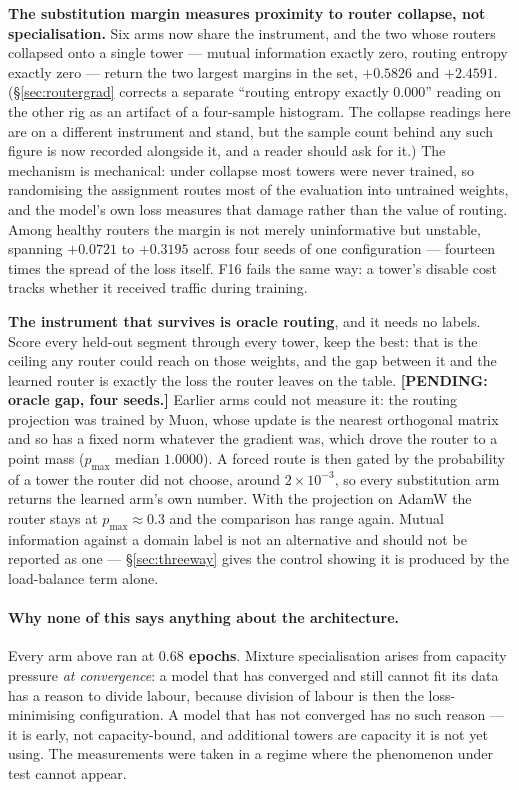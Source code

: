 \documentclass[11pt]{article}
\begin{document}
\textbf{The substitution margin measures proximity to router collapse, not specialisation.} Six arms now share the instrument, and the two whose routers collapsed onto a single tower --- mutual information exactly zero, routing entropy exactly zero --- return the two largest margins in the set, $+0.5826$ and $+2.4591$. (\S\ref{sec:routergrad} corrects a separate ``routing entropy exactly $0.000$'' reading on the other rig as an artifact of a four-sample histogram. The collapse readings here are on a different instrument and stand, but the sample count behind any such figure is now recorded alongside it, and a reader should ask for it.) The mechanism is mechanical: under collapse most towers were never trained, so randomising the assignment routes most of the evaluation into untrained weights, and the model's own loss measures that damage rather than the value of routing. Among healthy routers the margin is not merely uninformative but unstable, spanning $+0.0721$ to $+0.3195$ across four seeds of one configuration --- fourteen times the spread of the loss itself. F16 fails the same way: a tower's disable cost tracks whether it received traffic during training.

\textbf{The instrument that survives is oracle routing}, and it needs no labels. Score every held-out segment through every tower, keep the best: that is the ceiling any router could reach on those weights, and the gap between it and the learned router is exactly the loss the router leaves on the table. \textbf{[PENDING: oracle gap, four seeds.]} Earlier arms could not measure it: the routing projection was trained by Muon, whose update is the nearest orthogonal matrix and so has a fixed norm whatever the gradient was, which drove the router to a point mass ($p_{\max}$ median $1.0000$). A forced route is then gated by the probability of a tower the router did not choose, around $2\times10^{-3}$, so every substitution arm returns the learned arm's own number. With the projection on AdamW the router stays at $p_{\max}\approx0.3$ and the comparison has range again. Mutual information against a domain label is not an alternative and should not be reported as one --- \S\ref{sec:threeway} gives the control showing it is produced by the load-balance term alone.

\paragraph{Why none of this says anything about the architecture.} Every arm above ran at \textbf{$0.68$ epochs}. Mixture specialisation arises from capacity pressure \emph{at convergence}: a model that has converged and still cannot fit its data has a reason to divide labour, because division of labour is then the loss-minimising configuration. A model that has not converged has no such reason --- it is early, not capacity-bound, and additional towers are capacity it is not yet using. The measurements were taken in a regime where the phenomenon under test cannot appear.
\end{document}
